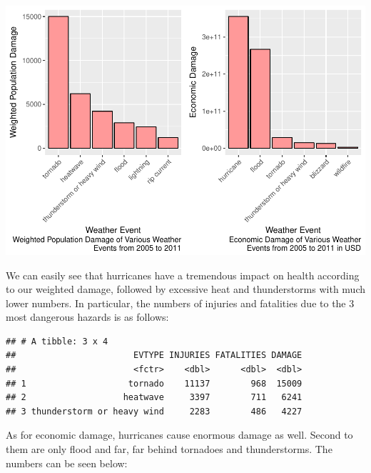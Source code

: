 \documentclass[]{article}
\newenvironment{Shaded}{\begin{snugshade}}{\end{snugshade}}
\newcommand{\KeywordTok}[1]{\textcolor[rgb]{0.13,0.29,0.53}{\textbf{{#1}}}}
\newcommand{\StringTok}[1]{\textcolor[rgb]{0.31,0.60,0.02}{{#1}}}
\newcommand{\NormalTok}[1]{{#1}}
\begin{document}
\includegraphics{StormData_files/figure-latex/damage_plots-1.pdf}

We can easily see that hurricanes have a tremendous impact on health
according to our weighted damage, followed by excessive heat and
thunderstorms with much lower numbers. In particular, the numbers of
injuries and fatalities due to the 3 most dangerous hazards is as
follows:

\begin{Shaded}
\end{Shaded}

\begin{verbatim}
## # A tibble: 3 x 4
##                       EVTYPE INJURIES FATALITIES DAMAGE
##                       <fctr>    <dbl>      <dbl>  <dbl>
## 1                    tornado    11137        968  15009
## 2                   heatwave     3397        711   6241
## 3 thunderstorm or heavy wind     2283        486   4227
\end{verbatim}

As for economic damage, hurricanes cause enormous damage as well. Second
to them are only flood and far, far behind tornadoes and thunderstorms.
The numbers can be seen below:

\begin{Shaded}
\end{Shaded}
\end{document}
